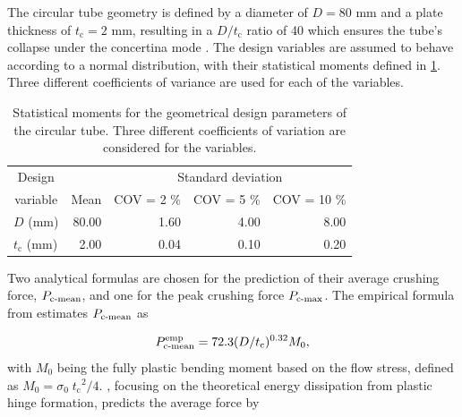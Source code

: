 \documentclass[12pt,number,preprint,review,times]{elsarticle}
\begin{document}
The circular tube geometry is defined by a diameter of $D = 80$ mm and a plate thickness of $t_\mathrm{c} = 2$ mm, resulting in a $D/t_\mathrm{c}$ ratio of 40 which ensures the tube's collapse under the concertina mode \citep{guillow2001quasi}. The design variables are assumed to behave according to a normal distribution, with their statistical moments defined in \cref{tab:vars_circ}. Three different coefficients of variance are used for each of the variables.

\begin{table}[!htpb]
\begin{center}
\small
\begin{tabular}[t]{lrrrr} \toprule
\multicolumn{1}{c}{Design} &  &  \multicolumn{3}{c}{Standard deviation}  \\\cmidrule{3-5}
\multicolumn{1}{c}{variable} & Mean       &    COV = 2 \%  &  COV = 5 \%      &    COV = 10 \%  \\\midrule
$D$ (mm) &  80.00 &  1.60 & 4.00 & 8.00   \\
$t_\mathrm{c}$ (mm) &  2.00 & 0.04 & 0.10 & 0.20 \\ %
\bottomrule
\end{tabular}
\captionsetup{justification=centering}
\caption{Statistical moments for the geometrical design parameters of the circular tube. Three different coefficients of variation are considered for the variables.}
\label{tab:vars_circ}
\end{center}
\end{table}

Two analytical formulas are chosen for the prediction of their average crushing force, $P_{\mathrm{c{\text -}mean}}$, and one for the peak crushing force $P_{\mathrm{c{\text -}max}}$. The empirical formula from \citet{guillow2001quasi} estimates $P_{\mathrm{c{\text -}mean}}$ as

\begin{equation}
\centering
    P^{\mathrm{emp}}_{\mathrm{c{\text -}mean}} = 72.3 (D / t_\mathrm{c})^{0.32} M_0,
\label{eq:pmean_emp}
\end{equation}
with $M_0$ being the fully plastic bending moment based on the flow stress, defined as $M_0 = \sigma_{0} \; {t_\mathrm{c}}^2 / {4}$. \citet{Abramowicz1986}, focusing on the theoretical energy dissipation from plastic hinge formation, predicts the average force by
\end{document}
